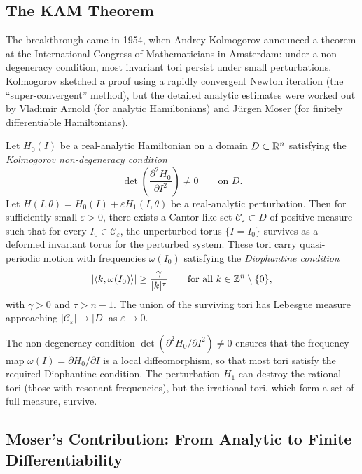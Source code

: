 \subsection{The KAM Theorem}

The breakthrough came in 1954, when Andrey Kolmogorov announced a theorem at the International Congress of Mathematicians in Amsterdam: under a non-degeneracy condition, most invariant tori persist under small perturbations. Kolmogorov sketched a proof using a rapidly convergent Newton iteration (the ``super-convergent'' method), but the detailed analytic estimates were worked out by Vladimir Arnold (for analytic Hamiltonians) and J\"{u}rgen Moser (for finitely differentiable Hamiltonians).

\begin{theorem}
Let $H_0(I)$ be a real-analytic Hamiltonian on a domain $D \subset \mathbb{R}^n$ satisfying the \textit{Kolmogorov non-degeneracy condition}
\[
\det\left(\frac{\partial^2 H_0}{\partial I^2}\right) \neq 0 \qquad \text{on } D.
\]
Let $H(I,\theta) = H_0(I) + \varepsilon H_1(I,\theta)$ be a real-analytic perturbation. Then for sufficiently small $\varepsilon > 0$, there exists a Cantor-like set $\mathcal{C}_\varepsilon \subset D$ of positive measure such that for every $I_0 \in \mathcal{C}_\varepsilon$, the unperturbed torus $\{I = I_0\}$ survives as a deformed invariant torus for the perturbed system. These tori carry quasi-periodic motion with frequencies $\omega(I_0)$ satisfying the \textit{Diophantine condition}
\[
|\langle k, \omega(I_0) \rangle| \geq \frac{\gamma}{|k|^{\tau}} \qquad \text{for all } k \in \mathbb{Z}^n \setminus \{0\},
\]
with $\gamma > 0$ and $\tau > n-1$. The union of the surviving tori has Lebesgue measure approaching $|\mathcal{C}_\varepsilon| \to |D|$ as $\varepsilon \to 0$.
\end{theorem}

The non-degeneracy condition $\det(\partial^2 H_0 / \partial I^2) \neq 0$ ensures that the frequency map $\omega(I) = \partial H_0 / \partial I$ is a local diffeomorphism, so that most tori satisfy the required Diophantine condition. The perturbation $H_1$ can destroy the rational tori (those with resonant frequencies), but the irrational tori, which form a set of full measure, survive.

\subsection{Moser's Contribution: From Analytic to Finite Differentiability}

